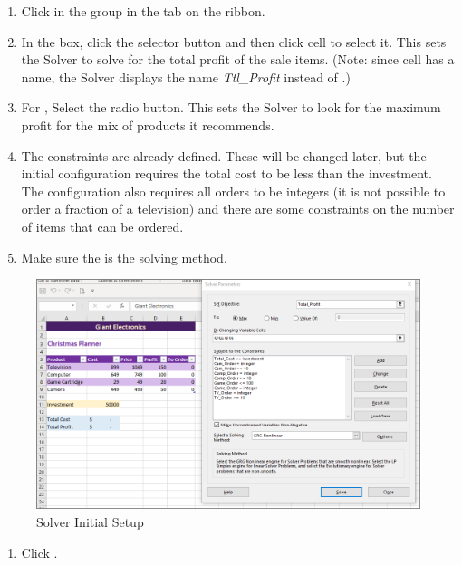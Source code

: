 \begin{enumerate}
	\item Click  in the  group in the  tab on the ribbon. 
	\item In the  box, click the selector button and then click cell  to select it. This sets the Solver to solve for the total profit of the sale items. (Note: since cell  has a name, the Solver displays the name \textit{Ttl\_Profit} instead of .)
	\item For , Select the  radio button. This sets the Solver to look for the maximum profit for the mix of products it recommends.
	\item The constraints are already defined. These will be changed later, but the initial configuration requires the total cost to be less than the investment. The configuration also requires all orders to be integers (it is not possible to order a fraction of a television) and there are some constraints on the number of items that can be ordered.
	\item Make sure the  is the solving method.
\end{enumerate}

\begin{figure}[H]
	\centering
	\includegraphics[width=\maxwidth{.95\linewidth}]{gfx/ch08_fig44}
	\caption{Solver Initial Setup}
	\label{08:fig44}
\end{figure}

\begin{enumerate}[resume]
	\item Click .
\end{enumerate}

